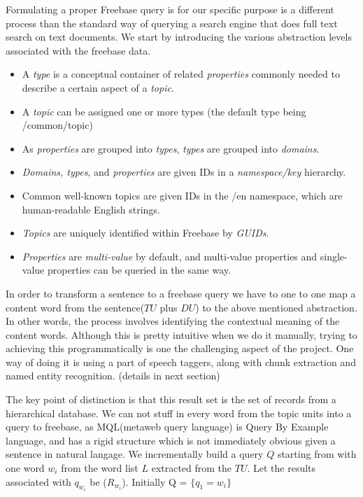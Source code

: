 \documentclass[12pt]{article}
\begin{document}
Formulating a proper Freebase query is for our specific purpose is a different process than the standard way of querying a search engine that does full text search on text documents. We start by introducing the  various abstraction levels associated with the freebase data.
\begin{itemize}
    \item  A {\em type} is a conceptual container of related {\em properties} commonly needed to describe a certain aspect of a {\em topic}.
    \item  A {\em topic} can be assigned one or more types (the default type being /common/topic)
    \item  As {\em properties} are grouped into {\em types}, {\em types} are grouped into {\em domains}.
    \item  {\em Domains, types}, and {\em properties} are given IDs in a {\em namespace/key} hierarchy.
    \item  Common well-known topics are given IDs in the /en namespace, which are human-readable English strings.
    \item  {\em Topics} are uniquely identified within Freebase by {\em GUIDs}.
    \item  {\em Properties} are {\em multi-value} by default, and multi-value properties and single-value properties can be queried in the same way.
\end{itemize}
In order to transform a sentence to a freebase query we have to one to one map a content word from the sentence($TU$ plus $DU$) to the above mentioned abstraction. In other words, the process involves identifying the contextual meaning of the content words. Although this is pretty intuitive when we do it manually, trying to achieving this programmatically is one the challenging aspect of the project. One way of doing it is using a part of speech taggers, along with chunk extraction and named entity recognition. (details in next section) 

The key point of distinction is that this result set is the set of records from a hierarchical database. We can not stuff in every word from the topic units into a query to freebase, as MQL(metaweb query language) is Query By Example language, and has a rigid structure which is not immediately obvious given a sentence in natural langage. We incrementally build a query $Q$ starting from with one word $w_{i}$ from the word list $L$ extracted from the $TU$. Let the results associated with $q_{w_{i}}$ be ($R_{w_{i}}$). Initially Q = $\{q_{1}=w_{i}\}$
\end{document}
